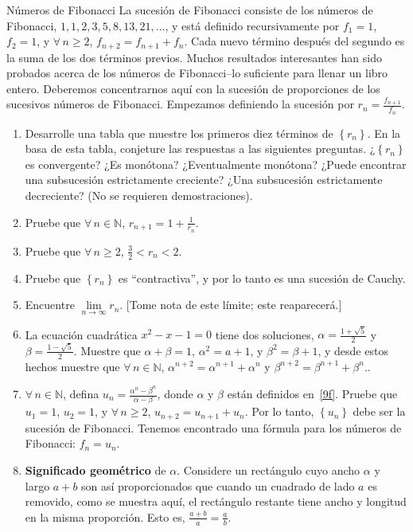 \begin{prob}{Números de Fibonacci}
	La sucesión de Fibonacci consiste de los números de Fibonacci, $1,1,2,3,5,8,13,21,\ldots$, y está definido recursivamente por $f_{1}=1$, $f_{2}=1$, y $\forall\,n\geq2$, $f_{n+2}=f_{n+1}+f_{n}$. Cada nuevo término después del segundo es la suma de los dos términos previos. Muchos resultados interesantes han sido probados acerca de los números de Fibonacci--lo suficiente para llenar un libro entero. Deberemos concentrarnos aquí con la sucesión de proporciones de los sucesivos números de Fibonacci. Empezamos definiendo la sucesión por $r_{n}=\tfrac{f_{n+1}}{f_{n}}$.
		\begin{enumerate}
			\item Desarrolle una tabla que muestre los primeros diez términos de $\left\{r_{n}\right\}$. En la basa de esta tabla, conjeture las respuestas a las siguientes preguntas. ¿$\left\{r_{n}\right\}$ es convergente? ¿Es monótona? ¿Eventualmente monótona? ¿Puede encontrar una subsucesión estrictamente creciente? ¿Una subsucesión estrictamente decreciente? (No se requieren demostraciones).
			\item Pruebe que $\forall\,n\in\mathds{N}$, $r_{n+1}=1+\tfrac{1}{r_{n}}$.
			\item Pruebe que $\forall\,n\geq2$, $\tfrac{3}{2}<r_{n}<2$.
			\item Pruebe que $\left\{r_{n}\right\}$ es ``contractiva'', y por lo tanto es una sucesión de Cauchy.
			\item Encuentre $\lim\limits_{n\to\infty}r_{n}$. [Tome nota de este límite; este reaparecerá.]
			\item La ecuación cuadrática $x^{2}-x-1=0$ tiene dos soluciones, $\alpha=\frac{1+\sqrt{5}}{2}$ y $\beta=\frac{1-\sqrt{5}}{2}$. Muestre que $\alpha+\beta=1$, $\alpha^{2}=a+1$, y $\beta^{2}=\beta+1$, y desde estos hechos muestre que $\forall\,n\in\mathbb{N}$, $\alpha^{n+2}=\alpha^{n+1}+\alpha^{n}$ y $\beta^{n+2}=\beta^{n+1}+\beta^{n}$..\label{9f}
			\item $\forall\,n\in\mathds{N}$, defina $u_{n}=\frac{\alpha^{n}-\beta^{n}}{\alpha-\beta}$, donde $\alpha$ y $\beta$ están definidos en~\ref{9f}. Pruebe que $u_{1}=1$, $u_{2}=1$, y $\forall\,n\geq2$, $u_{n+2}=u_{n+1}+u_{n}$. Por lo tanto, $\left\{u_{n}\right\}$ debe ser la sucesión de Fibonacci. Tenemos encontrado una fórmula para los números de Fibonacci: $f_{n}=u_{n}$.
			\item \textbf{Significado geométrico} de $\alpha$. Considere un rectángulo cuyo ancho $\alpha$ y largo $a+b$ son así proporcionados que cuando un cuadrado de lado $a$ es removido, como se muestra aquí, el rectángulo restante tiene ancho y longitud en la misma proporción. Esto es, $\tfrac{a+b}{a}=\tfrac{a}{b}$.
	

\end{enumerate}
\end{prob}
